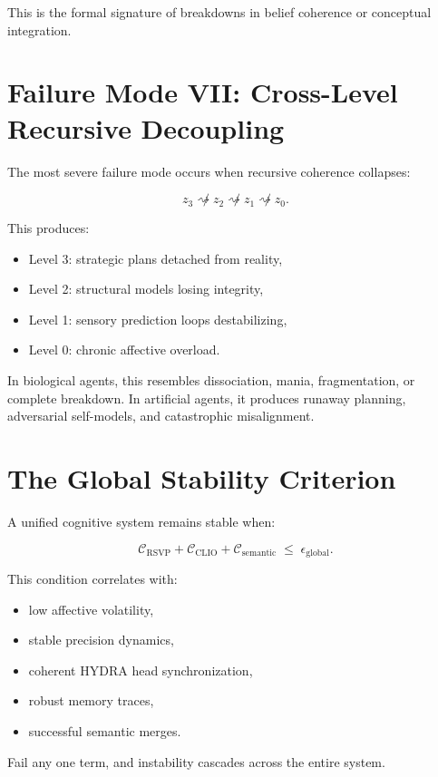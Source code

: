 \documentclass[12pt,oneside]{book}
\theoremstyle{plain}
\theoremstyle{definition}
\begin{document}
This is the formal signature of breakdowns in belief coherence or conceptual
integration.

\section{Failure Mode VII: Cross-Level Recursive Decoupling}

The most severe failure mode occurs when recursive coherence collapses:

\[
z_3 \not\rightsquigarrow z_2 \not\rightsquigarrow z_1 \not\rightsquigarrow z_0.
\]

This produces:

\begin{itemize}
    \item Level 3: strategic plans detached from reality,
    \item Level 2: structural models losing integrity,
    \item Level 1: sensory prediction loops destabilizing,
    \item Level 0: chronic affective overload.
\end{itemize}

In biological agents, this resembles dissociation, mania, fragmentation, or
complete breakdown.
In artificial agents, it produces runaway planning, adversarial self-models,
and catastrophic misalignment.

\section{The Global Stability Criterion}

A unified cognitive system remains stable when:

\[
\boxed{
\mathcal{C}_{\mathrm{RSVP}}
+
\mathcal{C}_{\mathrm{CLIO}}
+
\mathcal{C}_{\mathrm{semantic}}
\;\le\;
\epsilon_{\mathrm{global}}.
}
\]

This condition correlates with:

\begin{itemize}
    \item low affective volatility,
    \item stable precision dynamics,
    \item coherent HYDRA head synchronization,
    \item robust memory traces,
    \item successful semantic merges.
\end{itemize}

Fail any one term, and instability cascades across the entire system.
\end{document}
